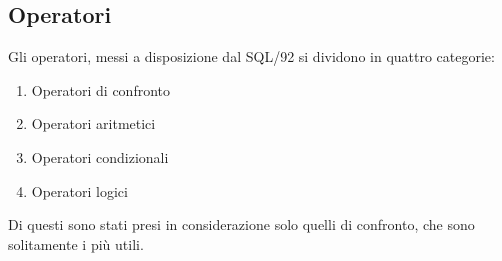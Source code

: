 \subsection{Operatori}
Gli operatori, messi a disposizione dal SQL/92 si dividono in quattro categorie:
\begin{enumerate}
\item Operatori di confronto
\item Operatori aritmetici
\item Operatori condizionali
\item Operatori logici
\end{enumerate}
Di questi sono stati presi in considerazione solo quelli di confronto, che sono solitamente i più utili. 